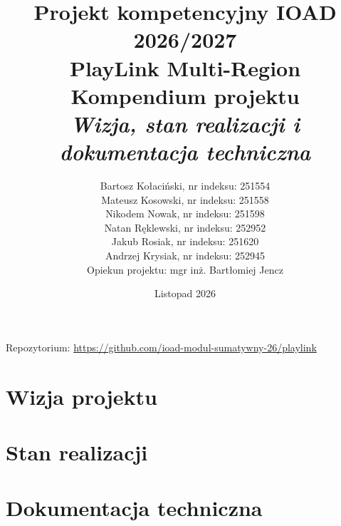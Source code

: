 \documentclass[11pt,a4paper,openany]{report}
\title{
    \large Projekt kompetencyjny IOAD 2026/2027 \\[0.3em]
    \Huge \textbf{PlayLink Multi-Region} \\[0.4em]
    \LARGE Kompendium projektu \\[0.2em]
    \large \textit{Wizja, stan realizacji i dokumentacja techniczna}
}
\author{
    Bartosz Kołaciński, nr indeksu: 251554 \\
    Mateusz Kosowski, nr indeksu: 251558 \\
    Nikodem Nowak, nr indeksu: 251598 \\
    Natan Ręklewski, nr indeksu: 252952 \\
    Jakub Rosiak, nr indeksu: 251620 \\
    Andrzej Krysiak, nr indeksu: 252945 \\[0.6em]
    \normalsize Opiekun projektu: mgr inż. Bartłomiej Jencz
}
\date{Listopad 2026}
\begin{document}
\maketitle
\vfill
\begin{center}\small
Repozytorium: \url{https://github.com/ioad-modul-sumatywny-26/playlink}
\end{center}
\newpage
{}
\tableofcontents
\newpage
{}



\part{Wizja projektu}


\part{Stan realizacji}


\part{Dokumentacja techniczna}





\appendix

\end{document}
